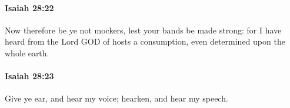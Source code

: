 		\paragraph{Isaiah 28:22} %
			\label{ISAIAH-28-22}

			Now therefore be ye not mockers, lest your bands be made strong: for I have heard from the Lord GOD of hosts a consumption, even determined upon the whole earth.


		\paragraph{Isaiah 28:23} %
			\label{ISAIAH-28-23}

			Give ye ear, and hear my voice; hearken, and hear my speech.


